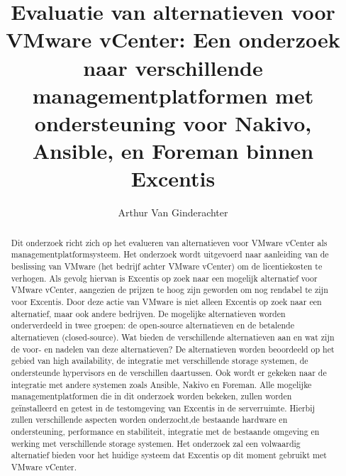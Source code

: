 \documentclass{hogent-article}
\title{Evaluatie van alternatieven voor VMware vCenter: Een onderzoek naar verschillende managementplatformen met ondersteuning voor Nakivo, Ansible, en Foreman binnen Excentis}
\author{Arthur Van Ginderachter}
\begin{document}
\begin{abstract}
Dit onderzoek richt zich op het evalueren van alternatieven voor VMware vCenter als managementplatformsysteem. Het onderzoek wordt uitgevoerd naar aanleiding van de beslissing van VMware (het bedrijf achter VMware vCenter) om de licentiekosten te verhogen. Als gevolg hiervan is Excentis op zoek naar een mogelijk alternatief voor VMware vCenter, aangezien de prijzen te hoog zijn geworden om nog rendabel te zijn voor Excentis. Door deze actie van VMware is niet alleen Excentis op zoek naar een alternatief, maar ook andere bedrijven.
De mogelijke alternatieven worden onderverdeeld in twee groepen: de open-source alternatieven en de betalende alternatieven (closed-source). Wat bieden de verschillende alternatieven aan en wat zijn de voor- en nadelen van deze alternatieven? De alternatieven worden beoordeeld op het gebied van high availability, de integratie met verschillende storage systemen, de ondersteunde hypervisors en de verschillen daartussen. Ook wordt er gekeken naar de integratie met andere systemen zoals Ansible, Nakivo en Foreman.
Alle mogelijke managementplatformen die in dit onderzoek worden bekeken, zullen worden geïnstalleerd en getest in de testomgeving van Excentis in de serverruimte. Hierbij zullen verschillende aspecten worden onderzocht,de bestaande hardware en ondersteuning, performance en stabiliteit, integratie met de bestaande omgeving en werking met verschillende storage systemen. Het onderzoek zal een volwaardig alternatief bieden voor het huidige systeem dat Excentis op dit moment gebruikt met VMware vCenter.
\end{abstract}

\tableofcontents

\newpage  %
\printbibliography[heading=bibintoc]
\end{document}

